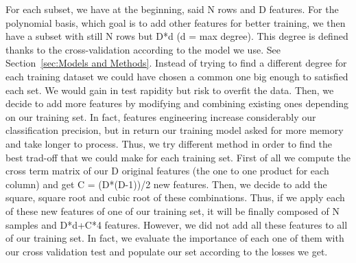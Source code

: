\documentclass[10pt,conference,compsocconf]{IEEEtran}
\begin{document}
For each subset, we have at the beginning, said N rows and D features. For the polynomial basis, which goal is to add other features for better training, we then have a subset with still N rows but D*d (d = max degree). This degree is defined thanks to the cross-validation according to the model we use. See Section~\ref{sec:Models and Methods}. Instead of trying to find a different degree for each training dataset we could have chosen a common one big enough to satisfied each set. We would gain in test rapidity but risk to overfit the data. Then, we decide to add more features by modifying and combining existing ones depending on our training set. In fact, features engineering increase considerably our classification precision, but in return our training model asked for more memory and take longer to process. Thus, we try different method in order to find the best trad-off that we could make for each training set. First of all we compute the cross term matrix of our D original features (the one to one product for each column) and get C = (D*(D-1))/2 new features. Then, we decide to add the square, square root and cubic root of these combinations. Thus, if we apply each of these new features of one of our training set, it will be finally composed of N samples and D*d+C*4 features. However, we did not add all these features to all of our training set. In fact, we evaluate the importance of each one of them with our cross validation test and populate our set according to the losses we get. 


%
%
\end{document}
